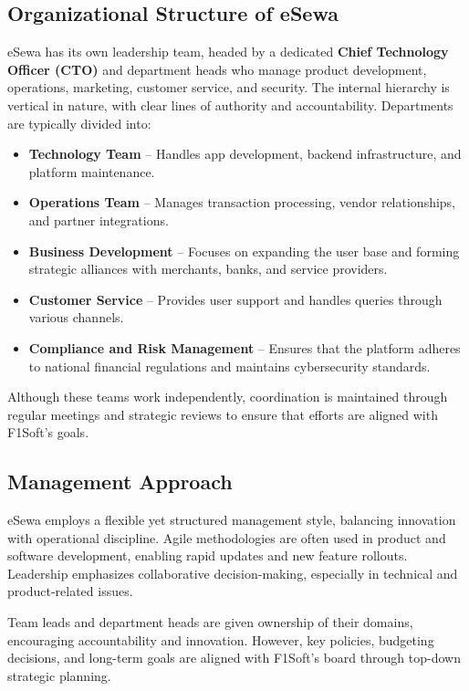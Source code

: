 \documentclass[12pt, a4paper]{report}
\begin{document}
\subsection{Organizational Structure of eSewa}
eSewa has its own leadership team, headed by a dedicated \textbf{Chief Technology Officer (CTO)} and department heads who manage product development, operations, marketing, customer service, and security. The internal hierarchy is vertical in nature, with clear lines of authority and accountability. Departments are typically divided into:

\begin{itemize}
  \item \textbf{Technology Team} – Handles app development, backend infrastructure, and platform maintenance.
  \item \textbf{Operations Team} – Manages transaction processing, vendor relationships, and partner integrations.
  \item \textbf{Business Development} – Focuses on expanding the user base and forming strategic alliances with merchants, banks, and service providers.
  \item \textbf{Customer Service} – Provides user support and handles queries through various channels.
  \item \textbf{Compliance and Risk Management} – Ensures that the platform adheres to national financial regulations and maintains cybersecurity standards.
\end{itemize}

Although these teams work independently, coordination is maintained through regular meetings and strategic reviews to ensure that efforts are aligned with F1Soft’s goals.
\vspace{18pt}
\subsection{Management Approach}
eSewa employs a flexible yet structured management style, balancing innovation with operational discipline. Agile methodologies are often used in product and software development, enabling rapid updates and new feature rollouts. Leadership emphasizes collaborative decision-making, especially in technical and product-related issues.

Team leads and department heads are given ownership of their domains, encouraging accountability and innovation. However, key policies, budgeting decisions, and long-term goals are aligned with F1Soft’s board through top-down strategic planning.
\end{document}
